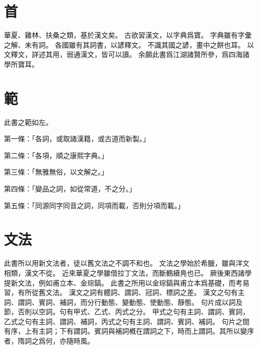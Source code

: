 \section{首}
華夏、雞林、扶桑之類，基於漢文矣。
古欲習漢文，以字典爲寶。
字典雖有字彙之解、未有詞。
各國雖有其詞書，以諺釋文。
不識其國之諺，畫中之餅也耳。
以文釋文，詳述其用，弱通漢文，皆可以讀。
余願此書爲江湖諸賢所參，爲四海諸學所寶耳。
\section{範}
此書之範如左。
\par 第一條：「各詞，或取諸漢籍，或古道而新製。」
\par 第二條：「各項，順之康熙字典。」
\par 第三條：「無雅無俗，以文解之。」
\par 第四條：「變品之詞，如從常道，不之分。」
\par 第五條：「同源同字同音之詞，同項而載，否則分項而載。」
\section{文法}
此書所以用新文法者，徒以舊文法之不調不和也。
文法之學始於希臘，雖與洋文相類，漢文不從。
近來華夏之學雖借拉丁文法，而斷鶴續鳧也已。
厥後東西諸學提新文法，例如甫立本、金琮鎬。
此書之所用以金琮鎬與甫立本爲基礎，而考易習，有所從舊文法。
漢文之詞有體詞、謂詞、冠詞、標詞之差。
漢文之句有主詞、謂詞、賓詞、補詞，而分行動態、變動態、使動態、靜態。
句片成以詞及節，否則以空詞。句有甲式、乙式、丙式之分。
甲式之句有主詞、謂詞、賓詞，乙式之句有主詞、謂詞、補詞，丙式之句有主詞、謂詞、賓詞、補詞。
句片之間有序，上有主詞；下有謂詞。賓詞與補詞槪在謂詞之下，時而上謂詞。其所以變序者，隋詞之爲何，亦隨時風。
